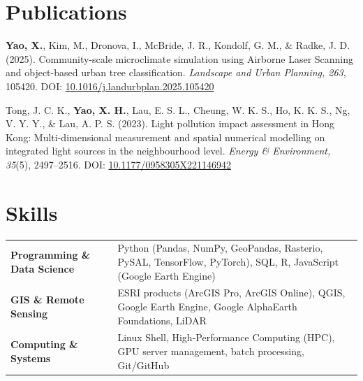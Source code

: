 \documentclass[a4paper,12pt]{article}
\begin{document}
\section{Publications}

\begin{etaremune}[leftmargin=1.5em, itemsep=0.7em, start=3]
    \item \textbf{Yao, X.}, Kim, M., Dronova, I., McBride, J. R., Kondolf, G. M., \& Radke, J. D. (2025). Community-scale microclimate simulation using Airborne Laser Scanning and object-based urban tree classification. \textit{Landscape and Urban Planning, 263}, 105420. DOI: \href{https://doi.org/10.1016/j.landurbplan.2025.105420}{10.1016/j.landurbplan.2025.105420}

    \item Tong, J. C. K., \textbf{Yao, X. H.}, Lau, E. S. L., Cheung, W. K. S., Ho, K. K. S., Ng, V. Y. Y., \& Lau, A. P. S. (2023). Light pollution impact assessment in Hong Kong: Multi-dimensional measurement and spatial numerical modelling on integrated light sources in the neighbourhood level. \textit{Energy \& Environment, 35}(5), 2497--2516. DOI: \href{https://doi.org/10.1177/0958305X221146942}{10.1177/0958305X221146942}

\end{etaremune}


\section{Skills}
\begin{tabularx}{\linewidth}{@{}l X@{}}
\textbf{Programming \& Data Science} & 
Python (Pandas, NumPy, GeoPandas, Rasterio, PySAL, TensorFlow, PyTorch), SQL, R, JavaScript (Google Earth Engine) \\ [3pt]
\textbf{GIS \& Remote Sensing} & 
ESRI products (ArcGIS Pro, ArcGIS Online), QGIS, Google Earth Engine, Google AlphaEarth Foundations, LiDAR \\ [3pt]
\textbf{Computing \& Systems} & 
Linux Shell, High-Performance Computing (HPC), GPU server management, batch processing, Git/GitHub \\
\end{tabularx}
\vfill
{}
\end{document}
